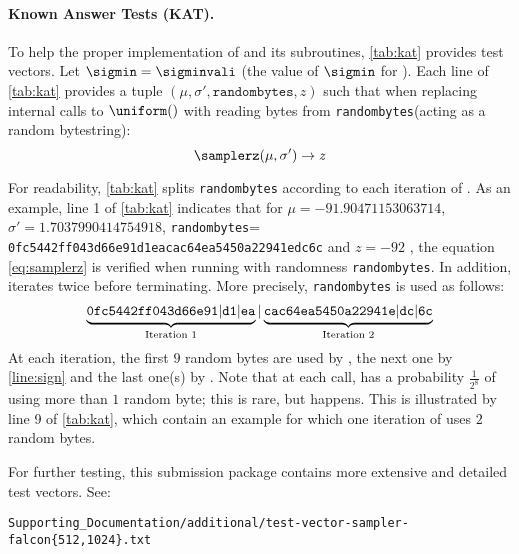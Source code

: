 

\newcommand{\randombytes}{\texttt{randombytes}\xspace}

\paragraph{Known Answer Tests (KAT).} To help the proper implementation of \longsamplerz and its subroutines, \cref{tab:kat} provides test vectors. Let $\sigmin = \sigminvali$ (the value of $\sigmin$ for ). Each line of \cref{tab:kat} provides a tuple $(\mu, \sigma', \randombytes, z)$ such that when replacing internal calls to $\uniform()$ with reading bytes from \randombytes (acting as a random bytestring):
\begin{equation}\label{eq:samplerz}
	 \samplerz(\mu, \sigma') \rightarrow z
\end{equation}

For readability, \cref{tab:kat} splits \randombytes according to each iteration of \samplerz. As an example, line 1 of \cref{tab:kat} indicates that for $\mu = -91.90471153063714$, $\sigma' = 1.7037990414754918$, \randombytes = {\small \texttt{0fc5442ff043d66e91d1eacac64ea5450a22941edc6c}} and $z = -92$ , the equation \eqref{eq:samplerz} is verified when running \samplerz with randomness \randombytes. In addition, \samplerz iterates twice before terminating. More precisely, \randombytes is used as follows:
\[
\underbrace{\tt 0fc5442ff043d66e91|d1|ea}_{\text{Iteration 1}}|
\underbrace{\tt cac64ea5450a22941e|dc|6c}_{\text{Iteration 2}}
\]
At each iteration, the first $9$ random bytes are used by \basesampler, the next one by \cref{line:sign} and the last one(s) by \berexp. Note that at each call, \berexp has a probability $\frac{1}{2^8}$ of using more than $1$ random byte; this is rare, but happens. This is illustrated by line 9 of \cref{tab:kat}, which contain an example for which one iteration of \berexp uses $2$ random bytes.

For further testing, this submission package contains more extensive and detailed test vectors. See:
\vspace{-4mm}
\begin{center}
{\small\tt Supporting\_Documentation/additional/test-vector-sampler-falcon\{512,1024\}.txt}
\end{center}


